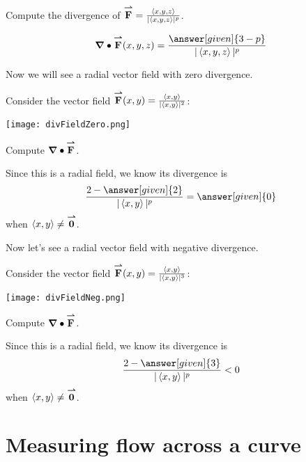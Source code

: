 \documentclass{ximera}
\begin{document}
\begin{question}
  Compute the divergence of ${\overset{\boldsymbol{\rightharpoonup}}{\mathbf{F}}} =\frac{\left\langle x,y,z\right\rangle}{|\left\langle x,y,z\right\rangle|^p}$.
  \begin{prompt}
    \[
    \divergence\vec{F}(x,y,z) = \frac{\answer[given]{3-p}}{|\vector{x,y,z}|^p}
    \]
  \end{prompt}
\end{question}

Now we will see a radial vector field with zero divergence.

\begin{example}
  Consider the vector field ${\overset{\boldsymbol{\rightharpoonup}}{\mathbf{F}}}(x,y) =
  \frac{\left\langle x,y\right\rangle}{|\left\langle x,y\right\rangle|^2}$:
  \begin{image}
    \texttt{[image: divFieldZero.png]}
  \end{image}
  Compute $\boldsymbol\nabla\bullet{\overset{\boldsymbol{\rightharpoonup}}{\mathbf{F}}}$.
  \begin{explanation}
    Since this is a radial field, we know its divergence is
    \[
    \frac{2-\answer[given]{2}}{|\vector{x,y}|^p} = \answer[given]{0}
    \]
    when $\left\langle x,y\right\rangle\ne{\overset{\boldsymbol{\rightharpoonup}}{\mathbf{0}}}$.
  \end{explanation}
\end{example}

Now let's see a radial vector field with negative divergence.

\begin{example}
  Consider the vector field ${\overset{\boldsymbol{\rightharpoonup}}{\mathbf{F}}}(x,y) =
  \frac{\left\langle x,y\right\rangle}{|\left\langle x,y\right\rangle|^3}$:
  \begin{image}
    \texttt{[image: divFieldNeg.png]}
  \end{image}
  Compute $\boldsymbol\nabla\bullet{\overset{\boldsymbol{\rightharpoonup}}{\mathbf{F}}}$.
  \begin{explanation}
    Since this is a radial field, we know its divergence is
    \[
    \frac{2-\answer[given]{3}}{|\vector{x,y}|^p} < 0
    \]
    when $\left\langle x,y\right\rangle\ne{\overset{\boldsymbol{\rightharpoonup}}{\mathbf{0}}}$.
  \end{explanation}
\end{example}

\section{Measuring flow across a curve}
\end{document}
